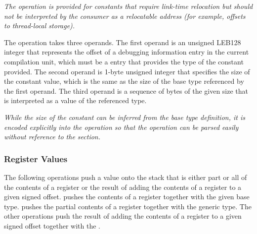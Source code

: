 \begin{enumerate}[1. ]
\textit{The \DWOPconstxNAME{} operation is provided for constants that
require link-time relocation but should not be
interpreted by the consumer as a relocatable address
(for example, offsets to thread-local storage).}

\itembfnl{\DWOPconsttypeTARG}
The \DWOPconsttypeNAME{} operation takes three operands. The first operand 
is an unsigned LEB128 integer that represents the offset of a debugging
information entry in the current compilation unit, which must be a
\DWTAGbasetype{} entry that provides the type of the constant provided. The
second operand is 1-byte unsigned integer that specifies the size of the
constant value, which is the same as the size of the base type referenced
by the first operand. The third operand is a 
sequence of bytes of the given size that is 
interpreted as a value of the referenced type.

\textit{While the size of the constant can be inferred from the base type
definition, it is encoded explicitly into the operation so that the
operation can be parsed easily without reference to the \dotdebuginfo{}
section.}

\end{enumerate}

\subsubsection{Register Values}
\label{chap:registervalues}
The following operations push a value onto the stack that is either 
\bb
part or all of
\eb
the contents of a register or the result of adding the contents of a 
register to a given signed offset. 
\DWOPregvaltype{} pushes the contents of
\bb
a 
\eb
register together with the given base type.
\bb
\DWOPregvalbits{} pushes the partial contents of
a register together with the generic type.
\eb
The other operations
push the result of adding the contents of a register to a given
signed offset together with the \generictype.

